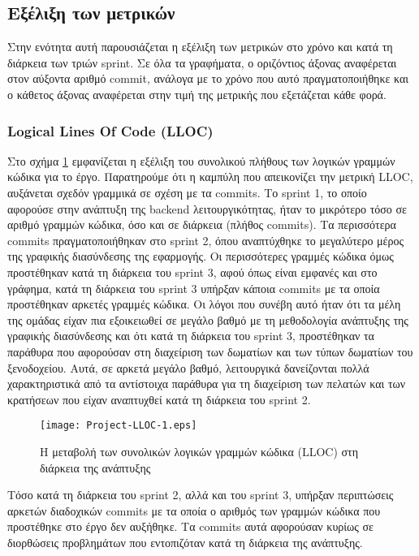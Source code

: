 \subsection{Εξέλιξη των μετρικών}

Στην ενότητα αυτή παρουσιάζεται η εξέλιξη των μετρικών στο χρόνο και
κατά τη διάρκεια των τριών sprint. Σε όλα τα γραφήματα, ο οριζόντιος
άξονας αναφέρεται στον αύξοντα αριθμό commit, ανάλογα με το χρόνο που
αυτό πραγματοποιήθηκε και ο κάθετος άξονας αναφέρεται στην τιμή της
μετρικής που εξετάζεται κάθε φορά.

\subsubsection{Logical Lines Of Code (LLOC)}
\label{section:projectLLOC}

Στο σχήμα \ref{fig:projectLLOC} εμφανίζεται η εξέλιξη του συνολικού
πλήθους των λογικών γραμμών κώδικα για το έργο. Παρατηρούμε ότι η
καμπύλη που απεικονίζει την μετρική LLOC, αυξάνεται σχεδόν γραμμικά σε
σχέση με τα commits. Το sprint 1, το οποίο αφορούσε στην ανάπτυξη της
backend λειτουργικότητας, ήταν το μικρότερο τόσο σε αριθμό γραμμών
κώδικα, όσο και σε διάρκεια (πλήθος commits). Τα περισσότερα commits
πραγματοποιήθηκαν στο sprint 2, όπου αναπτύχθηκε το μεγαλύτερο μέρος της
γραφικής διασύνδεσης της εφαρμογής. Οι περισσότερες γραμμές κώδικα όμως
προστέθηκαν κατά τη διάρκεια του sprint 3, αφού όπως είναι εμφανές και
στο γράφημα, κατά τη διάρκεια του sprint 3 υπήρξαν κάποια commits με τα
οποία προστέθηκαν αρκετές γραμμές κώδικα. Οι λόγοι που συνέβη αυτό ήταν
ότι τα μέλη της ομάδας είχαν πια εξοικειωθεί σε μεγάλο βαθμό με τη
μεθοδολογία ανάπτυξης της γραφικής διασύνδεσης και ότι κατά τη διάρκεια
του sprint 3, προστέθηκαν τα παράθυρα που αφορούσαν στη διαχείριση των
δωματίων και των τύπων δωματίων του ξενοδοχείου. Αυτά, σε αρκετά μεγάλο
βαθμό, λειτουργικά δανείζονται πολλά χαρακτηριστικά από τα αντίστοιχα
παράθυρα για τη διαχείριση των πελατών και των κρατήσεων που είχαν
αναπτυχθεί κατά τη διάρκεια του sprint 2.

\begin{figure}
\centering
\texttt{[image: Project-LLOC-1.eps]}
\caption{Η μεταβολή των συνολικών λογικών γραμμών κώδικα (LLOC) στη διάρκεια της ανάπτυξης}
\label{fig:projectLLOC}
\end{figure}

Τόσο κατά τη διάρκεια του sprint 2, αλλά και του sprint 3,
υπήρξαν περιπτώσεις αρκετών διαδοχικών commits με τα οποία ο
αριθμός των γραμμών κώδικα που προστέθηκε στο έργο δεν αυξήθηκε.
Τα commits αυτά αφορούσαν κυρίως σε διορθώσεις προβλημάτων που
εντοπιζόταν κατά τη διάρκεια της ανάπτυξης.

